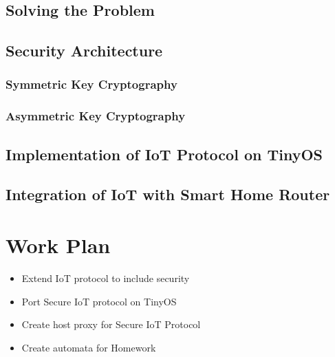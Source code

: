 \documentclass{mprop}
\begin{document}
\subsection{Solving the Problem} %
\label{sub:solving_the_problem}

\subsection{Security Architecture} %
\label{sub:security_architecture}

\subsubsection{Symmetric Key Cryptography} %
\label{ssub:symmetric_key_cryptography}

\subsubsection{Asymmetric Key Cryptography} %
\label{ssub:asymmetric_key_cryptography}


\subsection{Implementation of IoT Protocol on TinyOS} %
\label{sub:implementation_of_iot_protocol_on_tinyos}


\subsection{Integration of IoT with Smart Home Router} %
\label{sub:implementation_of_iot_on_smart_home_router}

\section{Work Plan}

\begin{itemize}
  \item Extend IoT protocol to include security 
  \item Port Secure IoT protocol on TinyOS
  \item Create host proxy for Secure IoT Protocol
  \item Create automata for Homework
\end{itemize}



\end{document}
